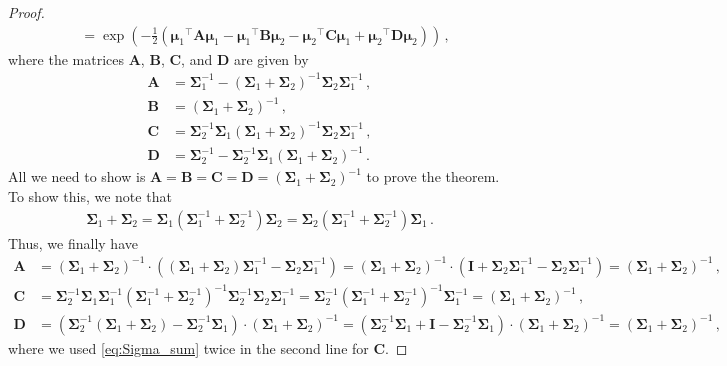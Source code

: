 \documentclass[a4paper]{article}
\newcommand{\bs}[1]{{\boldsymbol{#1}}}
\newcommand{\transpose}[1]{{#1}^\top}
\theoremstyle{definition}
\begin{document}
\begin{proof}
\begin{align*}
        & = \exp \left( -\frac{1}{2} \left( \transpose{\bs{\mu}_1} \bs{A} \bs{\mu}_1 - \transpose{\bs{\mu}_1} \bs{B} \bs{\mu}_2 - \transpose{\bs{\mu}_2} \bs{C} \bs{\mu}_1 + \transpose{\bs{\mu}_2} \bs{D} \bs{\mu}_2 \right) \right) \,,
    \end{align*}
    where the matrices $\bs{A}$, $\bs{B}$, $\bs{C}$, and $\bs{D}$ are given by
    \begin{align*}
        \bs{A} & = \bs{\Sigma}^{-1}_1 - \left( \bs{\Sigma}_1 + \bs{\Sigma}_2 \right)^{-1} \bs{\Sigma}_2 \bs{\Sigma}^{-1}_1 \,, \\
        \bs{B} & = \left( \bs{\Sigma}_1 + \bs{\Sigma}_2 \right)^{-1} \,, \\
        \bs{C} & = \bs{\Sigma}^{-1}_2 \bs{\Sigma}_1 \left( \bs{\Sigma}_1 + \bs{\Sigma}_2 \right)^{-1} \bs{\Sigma}_2 \bs{\Sigma}^{-1}_1 \,, \\
        \bs{D} & = \bs{\Sigma}^{-1}_2 - \bs{\Sigma}^{-1}_2 \bs{\Sigma}_1 \left( \bs{\Sigma}_1 + \bs{\Sigma}_2 \right)^{-1} \,. 
    \end{align*}
    All we need to show is $\bs{A} = \bs{B} = \bs{C} = \bs{D} = \left( \bs{\Sigma}_1 + \bs{\Sigma}_2 \right)^{-1}$ to prove the theorem. To show this, we note that 
    \begin{align}
        \bs{\Sigma}_1 + \bs{\Sigma}_2 = \bs{\Sigma}_1 \left( \bs{\Sigma}_1^{-1} + \bs{\Sigma}_2^{-1} \right) \bs{\Sigma}_2 = \bs{\Sigma}_2 \left( \bs{\Sigma}_1^{-1} + \bs{\Sigma}_2^{-1} \right) \bs{\Sigma}_1 \,. \label{eq:Sigma_sum}
    \end{align}
    Thus, we finally have
    \begin{align*}
        \bs{A} & = \left( \bs{\Sigma}_1 + \bs{\Sigma}_2 \right)^{-1} \cdot \left( \left( \bs{\Sigma}_1 + \bs{\Sigma}_2 \right) \bs{\Sigma}^{-1}_1 - \bs{\Sigma}_2 \bs{\Sigma}^{-1}_1 \right) = \left( \bs{\Sigma}_1 + \bs{\Sigma}_2 \right)^{-1} \cdot \left( \mathbf{I} + \bs{\Sigma}_2 \bs{\Sigma}^{-1}_1 - \bs{\Sigma}_2 \bs{\Sigma}^{-1}_1 \right) = \left( \bs{\Sigma}_1 + \bs{\Sigma}_2 \right)^{-1} \,, \\
        \bs{C} & = \bs{\Sigma}^{-1}_2 \bs{\Sigma}_1 \bs{\Sigma}_1^{-1} \left( \bs{\Sigma}_1^{-1} + \bs{\Sigma}_2^{-1} \right)^{-1} \bs{\Sigma}_2^{-1} \bs{\Sigma}_2 \bs{\Sigma}^{-1}_1 = \bs{\Sigma}^{-1}_2 \left( \bs{\Sigma}_1^{-1} + \bs{\Sigma}_2^{-1} \right)^{-1} \bs{\Sigma}^{-1}_1 =  \left( \bs{\Sigma}_1 + \bs{\Sigma}_2 \right)^{-1} \,, \\
        \bs{D} & = \left( \bs{\Sigma}^{-1}_2 \left( \bs{\Sigma}_1 + \bs{\Sigma}_2 \right) - \bs{\Sigma}^{-1}_2 \bs{\Sigma}_1 \right) \cdot \left( \bs{\Sigma}_1 + \bs{\Sigma}_2 \right)^{-1} = \left( \bs{\Sigma}^{-1}_2 \bs{\Sigma}_1 + \mathbf{I} - \bs{\Sigma}^{-1}_2 \bs{\Sigma}_1 \right) \cdot \left( \bs{\Sigma}_1 + \bs{\Sigma}_2 \right)^{-1} = \left( \bs{\Sigma}_1 + \bs{\Sigma}_2 \right)^{-1} \,,
    \end{align*}
    where we used \eqref{eq:Sigma_sum} twice in the second line for $\bs{C}$.
\end{proof}
\end{document}
